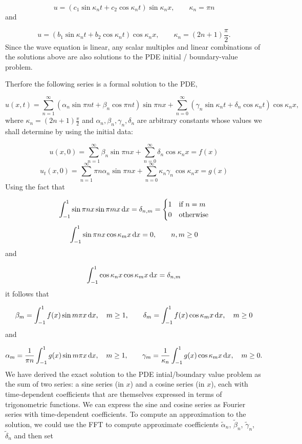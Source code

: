 \documentclass[12pt,a4paper]{article}
\begin{document}
\[
u = \left( c_1 \sin\kappa_n t + c_2\cos\kappa_n t \right)\sin \kappa_n x, \qquad \kappa_n = \pi n
\]
and

\[
u = \left( b_1 \sin\kappa_n t + b_2\cos\kappa_n t \right)\cos \kappa_n x, \qquad \kappa_n =(2n + 1)\frac{\pi}{2}.
\]
Since the wave equation is linear, any scalar multiples and linear combinations of the solutions above are also solutions to the PDE initial / boundary-value problem. 

Therfore the following series is a formal solution to the PDE,

\[
u(x,t) = \sum_{n = 1}^{\infty} \left(\alpha_n\sin\pi n t + \beta_n\cos\pi n t  \right)\sin\pi n x +  \sum_{n = 0}^{\infty} \left(\gamma_n\sin \kappa_n t + \delta_n\cos \kappa_n t  \right)\cos\kappa_n x,
\]
where $\kappa_n =(2n + 1)\frac{\pi}{2}$ and  $\alpha_n, \beta_n, \gamma_n, \delta_n$ are arbitrary constants whose values we shall determine by using the initial data:

\[
u(x,0) = \sum_{n = 1}^{\infty} \beta_n  \sin\pi n x +  \sum_{n = 0}^{\infty} \delta_n \cos\kappa_n x = f(x)
\]
\[
u_t(x,0) = \sum_{n = 1}^{\infty} \pi n\alpha_n  \sin\pi n x +  \sum_{n = 0}^{\infty}\kappa_n \gamma_n \cos\kappa_n x = g(x)
\]
Using the fact that 

\[
\int_{-1}^{1} \sin \pi n x \sin \pi m x\, {\rm d}x = \delta_{n,m} = \begin{cases}
1 & \text{if } n = m \\
0 & \text{otherwise}
\end{cases}
\]
\[
\int_{-1}^{1} \sin \pi n x \cos \kappa_m x\, {\rm d}x = 0, \qquad n, m \geq 0 
\]
and

\[
\int_{-1}^{1} \cos \kappa_n x \cos \kappa_m x\, {\rm d}x = \delta_{n,m} 
\]
it follows that

\[
\beta_m = \int_{-1}^{1} f(x) \sin m\pi x \,{\rm d}x, \quad m\geq 1, \qquad \delta_m = \int_{-1}^{1} f(x) \cos \kappa_m x \,{\rm d}x,\quad m \geq 0
\]
and

\[
\alpha_m = \frac{1}{\pi n}\int_{-1}^{1} g(x) \sin m\pi x \,{\rm d}x, \quad m\geq 1, \qquad \gamma_m = \frac{1}{\kappa_n}\int_{-1}^{1} g(x) \cos \kappa_m x \,{\rm d}x,\quad m \geq 0.
\]
We have derived the exact solution to the PDE intial/boundary value problem as the sum of two series: a sine series (in $x$) and a cosine series (in $x$), each with time-dependent coefficients that are themselves expressed in terms of trigonometric functions.  We can express the sine and cosine series as Fourier series with time-dependent coefficients.  To compute an approximation to the solution, we could use the FFT to compute approximate coefficients  $\tilde{\alpha}_n$, $\tilde{\beta}_n$, $\tilde{\gamma}_n$, $\tilde{\delta}_n$ and then set
\end{document}
